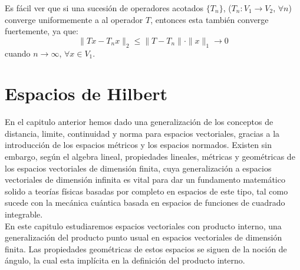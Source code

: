 \documentclass[12pt]{book}
\numberwithin{equation}{chapter}
\def\rar{\rightarrow}
\begin{document}
\vspace{3 mm}

Es f\'acil ver que si una sucesi\'on de operadores acotados $\{T_{n}\}$, ($ T_{n}:V_{1} \rar V_{2} $, $\forall n $) converge uniformemente a al operador $T$, entonces esta tambi\'en converge fuertemente, ya que:
$$ \| Tx - T_{n}x \|_{2} \leq \|  T-T_{n} \| \cdot \| x \|_{1} \rar 0 $$
cuando $ n \rar \infty $, $ \forall x \in V_{1} $.\\


\chapter{Espacios de Hilbert}
En el capitulo anterior hemos dado una generalizaci\'on de los conceptos de distancia, limite, continuidad y norma para espacios vectoriales, gracias a la introducci\'on de los espacios m\'etricos y los espacios normados. Existen sin embargo, seg\'un el algebra lineal, propiedades lineales, m\'etricas y geom\'etricas de los espacios vectoriales de dimensi\'on finita, cuya generalizaci\'on a espacios vectoriales de dimensi\'on infinita es vital para dar un fundamento matem\'atico solido a teor\'ias f\'isicas basadas por completo en espacios de este tipo, tal como sucede con la mec\'anica cu\'antica basada en espacios de funciones de cuadrado integrable.\\ 
En este capitulo estudiaremos espacios vectoriales con producto interno, una generalizaci\'on del producto punto usual en espacios vectoriales de dimensi\'on finita. Las propiedades geom\'etricas de estos espacios se siguen de la noci\'on de \'angulo, la cual esta impl\'icita en la definici\'on del producto interno.

\vspace{10 mm}
\end{document}
